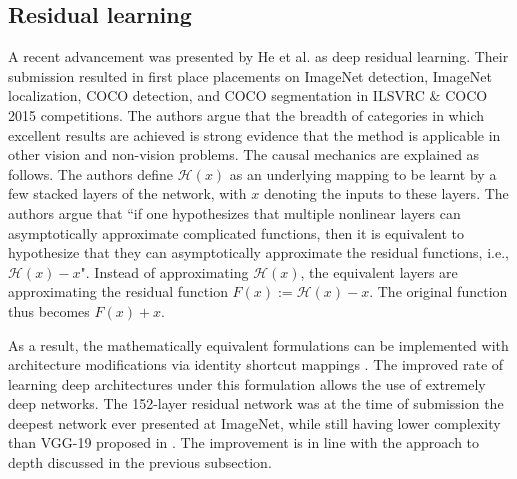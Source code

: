 \documentclass[12pt]{llncs}
\begin{document}




\subsection{Residual learning}
A recent advancement was presented by He et al. \cite{he2016deep} as deep residual learning. Their submission resulted in first place placements on ImageNet detection, ImageNet localization, COCO detection, and COCO segmentation in ILSVRC \&
COCO 2015 competitions. The authors argue that the breadth of categories in which excellent results are achieved is strong evidence that the method is applicable in other vision and non-vision problems. 
The causal mechanics are explained as follows. The authors define $\mathcal{H}(x)$ as an underlying mapping to be learnt by a few stacked layers of the network, with $x$ denoting the inputs to these layers. The authors argue that ``if one hypothesizes that multiple nonlinear layers can asymptotically approximate complicated functions, then it is equivalent to hypothesize that they can asymptotically approximate the residual functions, i.e., $\mathcal{H}(x) - x$". Instead of approximating $\mathcal{H}(x)$, the equivalent layers are approximating the residual function $F(x) := \mathcal{H}(x) - x$. The original function thus becomes $F(x)+x$. 

As a result, the mathematically equivalent formulations can be implemented with architecture modifications via identity shortcut mappings \cite[Figure 3]{he2016deep}. The improved rate of learning deep architectures under this formulation allows the use of extremely deep networks. The 152-layer residual network was at the time of submission the deepest network ever presented at ImageNet, while still having lower complexity than VGG-19 proposed in \cite{simonyan2014very}. The improvement is in line with the approach to depth discussed in the previous subsection.
\end{document}
